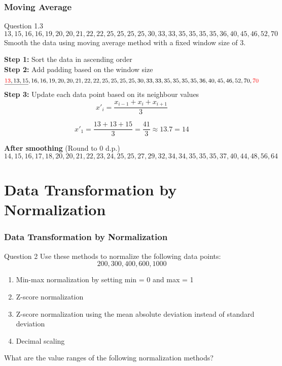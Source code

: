 \documentclass[aspectratio=169, 10pt]{beamer}
\begin{document}
\begin{frame}[t]
    \frametitle{Moving Average}
    \small

    \begin{block}{Question 1.3}
        \[13,15,16,16,19,20,20,21,22,22,25,25,25,25,30,33,33,35,35,35,35,36,40,45,46,52,70\]
        Smooth the data using moving average method with a fixed window size of 3.
    \end{block}

    \textbf{Step 1:} Sort the data in ascending order \\
    \textbf{Step 2:} Add padding based on the window size
    \[\underline{\textcolor{red}{13},13,15},16,16,19,20,20,21,22,22,25,25,25,25,30,33,33,35,35,35,35,36,40,45,46,52,70,\textcolor{red}{70}\]
    \textbf{Step 3:} Update each data point based on its neighbour values
    \[x'_i = \frac{x_{i-1} + x_i + x_{i+1}}{3}\]

    \[x'_1 = \frac{13+13+15}{3}=\frac{41}{3}\approx 13.7 = 14 \]

    \textbf{After smoothing} (Round to 0 d.p.)
    \[14, 15, 16, 17, 18, 20, 20, 21, 22, 23, 24, 25, 25, 27, 29, 32, 34, 34, 35, 35, 35, 37, 40, 44, 48, 56, 64\]
\end{frame}

\section{Data Transformation by Normalization}
\begin{frame}[t]
    \frametitle{Data Transformation by Normalization}

    \begin{block}{Question 2}
        Use these methods to normalize the following data points:
        \[200, 300, 400, 600, 1000\]
    \end{block}

    \begin{enumerate}
        \item Min-max normalization by setting min = 0 and max = 1
        \item Z-score normalization
        \item Z-score normalization using the mean absolute deviation instead of standard deviation
        \item Decimal scaling
    \end{enumerate}

    What are the value ranges of the following normalization methods?

\end{frame}
\end{document}
